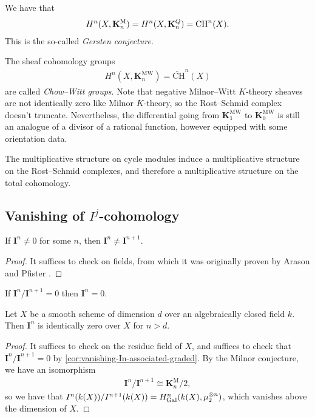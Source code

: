 \documentclass[11pt,openany]{book}
\providecommand{\KM}{\mathbf{K}^\mathrm{M}}
\providecommand{\KMW}{\mathbf{K}^\mathrm{MW}}
\providecommand{\CHW}{\widetilde{\mathrm{CH}}}
\begin{document}
\begin{corollary} We have that
\begin{align*}
    H^n(X,\KM_n) = H^n(X, \mathbf{K}^Q_n) = \CH^n(X).
\end{align*}
This is the so-called \textit{Gersten conjecture}.
\end{corollary}


\begin{definition} The sheaf cohomology groups
\begin{align*}
    H^n(X, \KMW_n) = \CHW^n(X)
\end{align*}
are called \textit{Chow--Witt groups}. Note that negative Milnor--Witt $K$-theory sheaves are not identically zero like Milnor $K$-theory, so the Rost--Schmid complex doesn't truncate. Nevertheless, the differential going from $\KMW_1$ to $\KMW_0$ is still an analogue of a divisor of a rational function, however equipped with some orientation data.
\end{definition}

\begin{remark} The multiplicative structure on cycle modules induce a multiplicative structure on the Rost--Schmid complexes, and therefore a multiplicative structure on the total cohomology.
\end{remark}




\subsection{Vanishing of $I^j$-cohomology}

\begin{proposition} If $\mathbf{I}^n \ne 0$ for some $n$, then $\mathbf{I}^n \ne \mathbf{I}^{n+1}$.
\end{proposition}
\begin{proof} It suffices to check on fields, from which it was originally proven by Arason and Pfister \cite[Korollar~2]{ArasonPfister}.
\end{proof}

\begin{corollary}\label{cor:vanishing-In-associated-graded} 
If $\mathbf{I}^n / \mathbf{I}^{n+1} = 0$ then $\mathbf{I}^n = 0$.
\end{corollary}




\begin{theorem} Let $X$ be a smooth scheme of dimension $d$ over an algebraically closed field $k$. Then $\mathbf{I}^{n}$ is identically zero over $X$ for $n>d$.
\end{theorem}
\begin{proof} It suffices to check on the residue field of $X$, and suffices to check that $\mathbf{I}^n/\mathbf{I}^{n+1} = 0$ by \autoref{cor:vanishing-In-associated-graded}. By the Milnor conjecture, we have an isomorphism
\begin{align*}
    \mathbf{I}^n/\mathbf{I}^{n+1} \cong \KM_n/2,
\end{align*}
so we have that $I^n(k(X))/I^{n+1}(k(X)) = H^n_{\mathrm{Gal}}(k(X), \mu_2^{\otimes n})$, which vanishes above the dimension of $X$. 
\end{proof}
\end{document}
